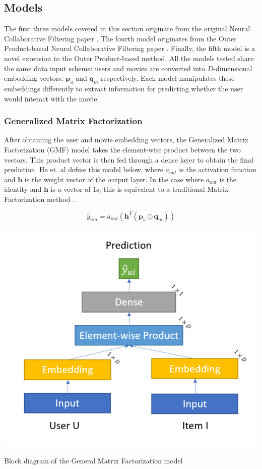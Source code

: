 \documentclass{article}
\begin{document}
\subsection{Models}
The first three models covered in this section originate from the original Neural Collaborative Filtering paper \cite{he2017neural}. The fourth model originates from the Outer Product-based Neural Collaborative Filtering paper \cite{he2018outer}. Finally, the fifth model is a novel extension to the Outer Product-based method. All the models tested share the same data input scheme: users and movies are converted into $D$-dimensional embedding vectors: $\mathbf{p}_u$ and $\mathbf{q}_m$ respectively. Each model manipulates these embeddings differently to extract information for predicting whether the user would interact with the movie.

\subsubsection{Generalized Matrix Factorization}
After obtaining the user and movie embedding vectors, the Generalized Matrix Factorization (GMF) model takes the element-wise product between the two vectors. This product vector is then fed through a dense layer to obtain the final prediction. He et. al define this model below, where $a_{out}$ is the activation function and $\mathbf{h}$ is the weight vector of the output layer. In the case where $a_{out}$ is the identity and $\mathbf{h}$ is a vector of 1s, this is equivalent to a traditional Matrix Factorization method \cite{he2017neural}.

\[
\hat{y}_{um}=a_{out}(\mathbf{h}^{T}(\mathbf{p}_u\odot\mathbf{q}_m))
\]

\begin{center}
\includegraphics[scale=0.275]{GMF_Diagram}

Block diagram of the General Matrix Factorization model
\end{center}
\end{document}
